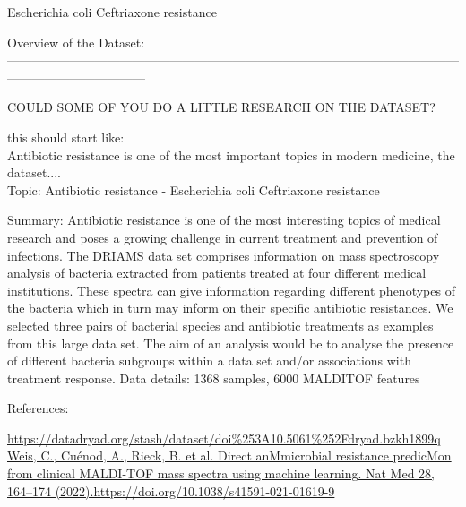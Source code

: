 \documentclass[100pt]{article}
\begin{document}
\setlength{\headsep}{35pt}
\fancyhf{}

\renewcommand\headrulewidth{0pt}
\pagestyle{fancy}

\begin{huge}
\begin{center}
Escherichia coli Ceftriaxone resistance
\break
\end{center}
\end{huge}


\begin{normalsize}\color {bluino}
\noindent Overview of the Dataset:\\
---------------------------------------------------------------------------------------------------------------------------------------------
\end{normalsize}

\begin{normalsize}

COULD SOME OF YOU DO A LITTLE RESEARCH ON THE DATASET?

this should start like:\\

Antibiotic resistance is one of the most important topics in modern medicine, the dataset....\\

Topic: Antibiotic resistance - Escherichia coli Ceftriaxone resistance

Summary: Antibiotic resistance is one of the most interesting topics of medical research and poses a growing challenge in current treatment and prevention of infections. The DRIAMS data set comprises information on mass spectroscopy analysis of bacteria extracted from patients treated at four different medical institutions. These spectra can give information regarding different phenotypes of the bacteria which in turn may inform on their specific antibiotic resistances. We selected three pairs of bacterial species and antibiotic treatments as examples from this large data set. The aim of an analysis would be to analyse the presence of different bacteria subgroups within a data set and/or associations with treatment response.
Data details: 1368 samples, 6000 MALDITOF features

References:

\url{https://datadryad.org/stash/dataset/doi%253A10.5061%252Fdryad.bzkh1899q}
\url{Weis, C., Cuénod, A., Rieck, B. et al. Direct anMmicrobial resistance predicMon from clinical MALDI-TOF mass spectra using machine learning. Nat Med 28, 164–174 (2022).https://doi.org/10.1038/s41591-021-01619-9}


\end{normalsize}
\end{document}
